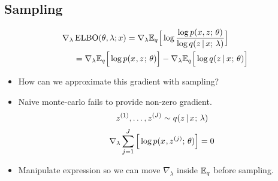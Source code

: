 




\subsection{Sampling}


\begin{frame}
\begin{align*}
    \nabla_\lambda &\operatorname*{ELBO}(\theta, \lambda ; x) =  \nabla_\lambda \mathbb{E}_q \Big[\log \frac{\log p(x, z ; \, \theta)}{\log q (z \,|\, x ; \, \lambda)} \Big]\\
    &= \nabla_\lambda {\mathbb{E}_{ q}\Big[ \log p(x^{}, z^{} ; \,\theta) \Big]} -\nabla_\lambda \mathbb{E}_{ q}\Big[ \log q( z^{} \,|\, x^{} ; \, \theta) \Big]  
\end{align*} 

\begin{itemize}
    \item How can we approximate this gradient with sampling?
    \item Naive monte-carlo fails to provide non-zero gradient.
    \[ z^{(1)}, \dots, z^{(J)} \sim q(z \,|\, x^{} ; \, \lambda) \]
 \[ \nabla_\lambda \sum_{j=1}^J \Big[ \log p(x^{}, z^{(j)} ; \, \theta) \Big] = 0\]
    \item Manipulate expression so we can move $\nabla_\lambda$ inside $\mathbb{E}_q$ before sampling.
\end{itemize}
\end{frame}


